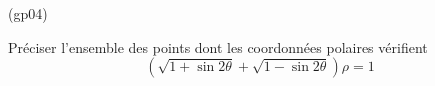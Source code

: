 \begin{tiny}(gp04)\end{tiny}
Préciser l'ensemble des points dont les coordonnées polaires vérifient
\[ \left(\sqrt{1+\sin 2\theta}+\sqrt{1-\sin 2\theta}\right) \rho =1\]
